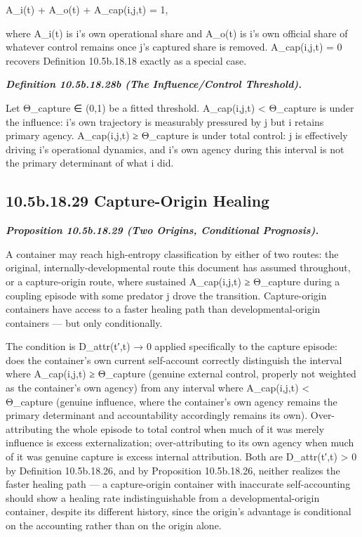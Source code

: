 \documentclass[
]{article}
\begin{document}
A\_i(t) + A\_o(t) + A\_cap(i,j,t) = 1,

where A\_i(t) is i's own operational share and A\_o(t) is i's own
official share of whatever control remains once j's captured share is
removed. A\_cap(i,j,t) = 0 recovers Definition 10.5b.18.18 exactly as a
special case.

\emph{\textbf{Definition 10.5b.18.28b (The Influence/Control
Threshold).}}

Let Θ\_capture ∈ (0,1) be a fitted threshold. A\_cap(i,j,t) \textless{}
Θ\_capture is under the influence: i's own trajectory is measurably
pressured by j but i retains primary agency. A\_cap(i,j,t) ≥ Θ\_capture
is under total control: j is effectively driving i's operational
dynamics, and i's own agency during this interval is not the primary
determinant of what i did.

\hypertarget{b.18.29-capture-origin-healing}{%
\subsection{10.5b.18.29 Capture-Origin
Healing}\label{b.18.29-capture-origin-healing}}

\emph{\textbf{Proposition 10.5b.18.29 (Two Origins, Conditional
Prognosis).}}

A container may reach high-entropy classification by either of two
routes: the original, internally-developmental route this document has
assumed throughout, or a capture-origin route, where sustained
A\_cap(i,j,t) ≥ Θ\_capture during a coupling episode with some predator
j drove the transition. Capture-origin containers have access to a
faster healing path than developmental-origin containers --- but only
conditionally.

The condition is D\_attr(t′,t) → 0 applied specifically to the capture
episode: does the container's own current self-account correctly
distinguish the interval where A\_cap(i,j,t) ≥ Θ\_capture (genuine
external control, properly not weighted as the container's own agency)
from any interval where A\_cap(i,j,t) \textless{} Θ\_capture (genuine
influence, where the container's own agency remains the primary
determinant and accountability accordingly remains its own).
Over-attributing the whole episode to total control when much of it was
merely influence is excess externalization; over-attributing to its own
agency when much of it was genuine capture is excess internal
attribution. Both are D\_attr(t′,t) \textgreater{} 0 by Definition
10.5b.18.26, and by Proposition 10.5b.18.26, neither realizes the faster
healing path --- a capture-origin container with inaccurate
self-accounting should show a healing rate indistinguishable from a
developmental-origin container, despite its different history, since the
origin's advantage is conditional on the accounting rather than on the
origin alone.
\end{document}
